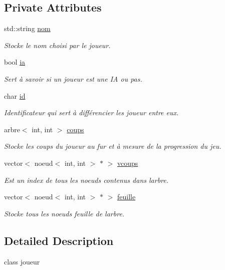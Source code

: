 \subsection*{Private Attributes}
\begin{DoxyCompactItemize}
\item 
std\+::string \hyperlink{classplayer_ae6c0f854d63dc4b938b52f10b4334dbc}{nom}
\begin{DoxyCompactList}\small\item\em Stocke le nom choisi par le joueur. \end{DoxyCompactList}\item 
bool \hyperlink{classplayer_ab5c7590da844e3e2128868820ab9ec45}{ia}
\begin{DoxyCompactList}\small\item\em Sert à savoir si un joueur est une IA ou pas. \end{DoxyCompactList}\item 
char \hyperlink{classplayer_a5862f005a5367e1b0dc19bdf2846fd34}{id}
\begin{DoxyCompactList}\small\item\em Identificateur qui sert à différencier les joueur entre eux. \end{DoxyCompactList}\item 
arbre$<$ int, int $>$ \hyperlink{classplayer_a5386c8bc522c5c0e39b1e071cf9ca37a}{coups}
\begin{DoxyCompactList}\small\item\em Stocke les coups du joueur au fur et à mesure de la progression du jeu. \end{DoxyCompactList}\item 
vector$<$ noeud$<$ int, int $>$ $\ast$ $>$ \hyperlink{classplayer_a577febe1e35c769385c8c7287df15939}{vcoups}
\begin{DoxyCompactList}\small\item\em Est un index de tous les noeuds contenus dans l\textquotesingle{}arbre. \end{DoxyCompactList}\item 
vector$<$ noeud$<$ int, int $>$ $\ast$ $>$ \hyperlink{classplayer_aa16931420b88ef2fc8ebe28a6bd26b1b}{feuille}
\begin{DoxyCompactList}\small\item\em Stocke tous les noeuds feuille de l\textquotesingle{}arbre. \end{DoxyCompactList}\end{DoxyCompactItemize}


\subsection{Detailed Description}
class joueur 

